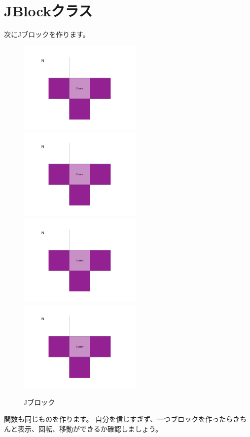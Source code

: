 \section{JBlockクラス}
次にJブロックを作ります。
\begin{figure}[h]
  \includegraphics[width=60mm, page=9]{images/Blocks.pdf}
  \includegraphics[width=60mm, page=10]{images/Blocks.pdf}
  \includegraphics[width=60mm, page=11]{images/Blocks.pdf}
  \includegraphics[width=60mm, page=12]{images/Blocks.pdf}
  \caption{Jブロック}
\end{figure}
関数も同じものを作ります。
自分を信じすぎず、一つブロックを作ったらきちんと表示、回転、移動ができるか確認しましょう。

\newpage
